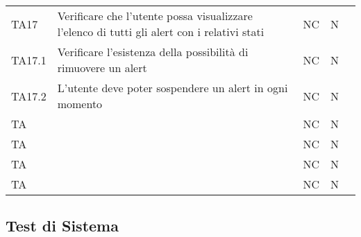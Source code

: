 \begin{longtable} {
		>{\centering}p{15mm} 
		>{\centering}p{79.5mm}
		>{\centering}p{15mm} 
		>{\centering}p{15mm}
		>{}p{0mm}}
	TA17 & Verificare che l'utente possa visualizzare l'elenco di tutti gli alert con i relativi stati & NC & N  &\TBstrut \\ [2mm]
	TA17.1 & Verificare l'esistenza della possibilità di rimuovere un alert & NC & N  &\TBstrut \\ [2mm]
	TA17.2 & L'utente deve poter sospendere un alert in ogni momento & NC & N  &\TBstrut \\ [2mm]
	TA &  & NC & N  &\TBstrut \\ [2mm]
	TA &  & NC & N  &\TBstrut \\ [2mm]
	TA &  & NC & N  &\TBstrut \\ [2mm]
	TA &  & NC & N  &\TBstrut \\ [2mm]
	
\end{longtable}


\subsection{Test di Sistema}

